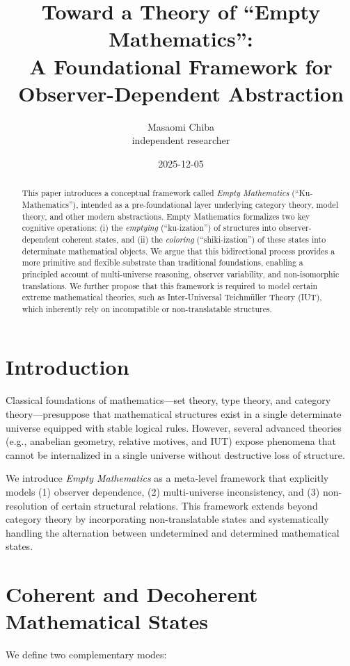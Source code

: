 \documentclass[11pt]{article}
\title{Toward a Theory of ``Empty Mathematics'':\\ A Foundational Framework for Observer-Dependent Abstraction}
\author{Masaomi Chiba\\ independent researcher}
\date{2025-12-05}
\begin{document}
\maketitle

\begin{abstract}
This paper introduces a conceptual framework called \emph{Empty Mathematics} (``Ku-Mathematics''),
intended as a pre-foundational layer underlying category theory, model theory, and other modern abstractions.
Empty Mathematics formalizes two key cognitive operations:
(i) the \emph{emptying} (``ku-ization'') of structures into observer-dependent coherent states, and
(ii) the \emph{coloring} (``shiki-ization'') of these states into determinate mathematical objects.
We argue that this bidirectional process provides a more primitive and flexible substrate than traditional foundations,
enabling a principled account of multi-universe reasoning, observer variability, and non-isomorphic translations.
We further propose that this framework is required to model certain extreme mathematical theories,
such as Inter-Universal Teichmüller Theory (IUT), which inherently rely on incompatible or non-translatable structures.
\end{abstract}

\section{Introduction}
Classical foundations of mathematics---set theory, type theory, and category theory---presuppose that
mathematical structures exist in a single determinate universe equipped with stable logical rules.
However, several advanced theories (e.g., anabelian geometry, relative motives, and IUT) expose phenomena
that cannot be internalized in a single universe without destructive loss of structure.

We introduce \emph{Empty Mathematics} as a meta-level framework that explicitly models
(1) observer dependence, (2) multi-universe inconsistency, and
(3) non-resolution of certain structural relations.
This framework extends beyond category theory by incorporating non-translatable states and
systematically handling the alternation between undetermined and determined mathematical states.

\section{Coherent and Decoherent Mathematical States}
We define two complementary modes:
\end{document}
